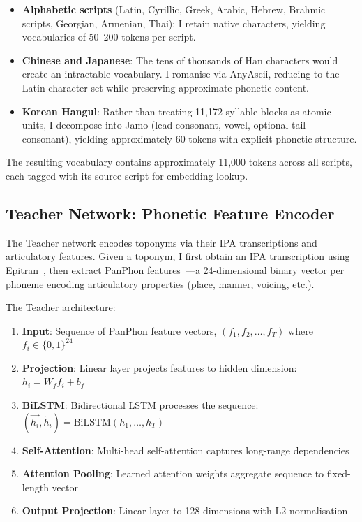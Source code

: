 \documentclass[11pt,a4paper]{article}
\newcommand{\embdim}{128}
\begin{document}
\begin{itemize}
    \item \textbf{Alphabetic scripts} (Latin, Cyrillic, Greek, Arabic, Hebrew, Brahmic scripts, Georgian, Armenian, Thai): I retain native characters, yielding vocabularies of 50--200 tokens per script.

    \item \textbf{Chinese and Japanese}: The tens of thousands of Han characters would create an intractable vocabulary. I romanise via AnyAscii, reducing to the Latin character set while preserving approximate phonetic content.

    \item \textbf{Korean Hangul}: Rather than treating 11,172 syllable blocks as atomic units, I decompose into Jamo (lead consonant, vowel, optional tail consonant), yielding approximately 60 tokens with explicit phonetic structure.
\end{itemize}

The resulting vocabulary contains approximately 11,000 tokens across all scripts, each tagged with its source script for embedding lookup.

\subsection{Teacher Network: Phonetic Feature Encoder}

The Teacher network encodes toponyms via their IPA transcriptions and articulatory features. Given a toponym, I first obtain an IPA transcription using Epitran~\citep{mortensen2018}, then extract PanPhon features~\citep{mortensen2016}---a 24-dimensional binary vector per phoneme encoding articulatory properties (place, manner, voicing, etc.).

The Teacher architecture:

\begin{enumerate}
    \item \textbf{Input}: Sequence of PanPhon feature vectors, $(f_1, f_2, \ldots, f_T)$ where $f_i \in \{0,1\}^{24}$
    \item \textbf{Projection}: Linear layer projects features to hidden dimension: $h_i = W_f f_i + b_f$
    \item \textbf{BiLSTM}: Bidirectional LSTM processes the sequence: $(\overrightarrow{h_i}, \overleftarrow{h_i}) = \text{BiLSTM}(h_1, \ldots, h_T)$
    \item \textbf{Self-Attention}: Multi-head self-attention captures long-range dependencies
    \item \textbf{Attention Pooling}: Learned attention weights aggregate sequence to fixed-length vector
    \item \textbf{Output Projection}: Linear layer to \embdim{} dimensions with L2 normalisation
\end{enumerate}
\end{document}
